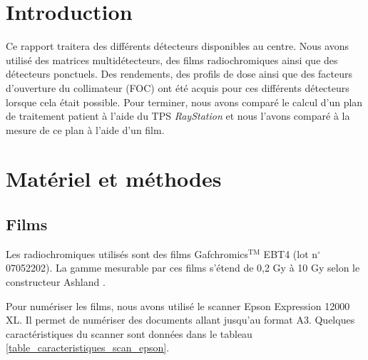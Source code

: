 \documentclass{book}
\begin{document}




\onehalfspacing

\pagestyle{fancy}
	\renewcommand\headrulewidth{0.5pt}
	\renewcommand\footrulewidth{0.5pt}
	\fancyfoot[R]{\thepage}

\tableofcontents
\clearpage
\chapter{Introduction}

Ce rapport traitera des différents détecteurs disponibles au centre. Nous avons utilisé des matrices multidétecteurs, des films radiochromiques ainsi que des détecteurs ponctuels. Des rendements, des profils de dose ainsi que des facteurs d'ouverture du collimateur (FOC) ont été acquis pour ces différents détecteurs lorsque cela était possible. Pour terminer, nous avons comparé le calcul d'un plan de traitement patient à l'aide du TPS \textit{RayStation} et nous l'avons comparé à la mesure de ce plan à l'aide d'un film.

\chapter{Matériel et méthodes}
\section{Films}

Les radiochromiques utilisés sont des films Gafchromics$^{\text{TM}}$ EBT4 (lot n$^{\circ}$07052202). La gamme mesurable par ces films s'étend de 0,2 Gy à 10 Gy selon le constructeur Ashland \cite{EBT4}.

Pour numériser les films, nous avons utilisé le scanner Epson Expression 12000 XL. Il permet de numériser des documents allant jusqu'au format A3. Quelques caractéristiques du scanner sont données dans le tableau \ref*{table_caracteristiques_scan_epson}.
\end{document}
